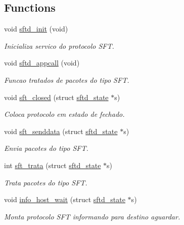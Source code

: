 \subsection*{Functions}
\begin{DoxyCompactItemize}
\item 
void \hyperlink{group__SFTD_gab05d3fde000321e5a849ec084474caf2}{sftd\_\-init} (void)
\begin{DoxyCompactList}\small\item\em Inicializa servico do protocolo SFT. \item\end{DoxyCompactList}\item 
void \hyperlink{group__SFTD_ga95d5c450883e216dccebd10b4adbca3c}{sftd\_\-appcall} (void)
\begin{DoxyCompactList}\small\item\em Funcao tratados de pacotes do tipo SFT. \item\end{DoxyCompactList}\item 
void \hyperlink{group__SFTD_ga77244ac0ad98e8d5ff310132595c4612}{sft\_\-closed} (struct \hyperlink{structsftd__state}{sftd\_\-state} $\ast$s)
\begin{DoxyCompactList}\small\item\em Coloca protocolo em estado de fechado. \item\end{DoxyCompactList}\item 
void \hyperlink{group__SFTD_ga0dd45f928eb9fd92057c3030a3718397}{sft\_\-senddata} (struct \hyperlink{structsftd__state}{sftd\_\-state} $\ast$s)
\begin{DoxyCompactList}\small\item\em Envia pacotes do tipo SFT. \item\end{DoxyCompactList}\item 
int \hyperlink{group__SFTD_ga3ba5af4fe8714e70fca97e743011e163}{sft\_\-trata} (struct \hyperlink{structsftd__state}{sftd\_\-state} $\ast$s)
\begin{DoxyCompactList}\small\item\em Trata pacotes do tipo SFT. \item\end{DoxyCompactList}\item 
void \hyperlink{group__SFTD_ga4a53cb826fb28e5b8968d169e929c244}{info\_\-host\_\-wait} (struct \hyperlink{structsftd__state}{sftd\_\-state} $\ast$s)
\begin{DoxyCompactList}\small\item\em Monta protocolo SFT informando para destino aguardar. \item\end{DoxyCompactList}\item 

\end{DoxyCompactItemize}
